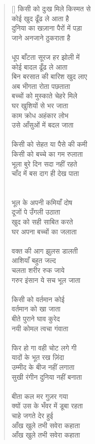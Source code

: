 \begin{verse}[\versewidth]\texthindi{
किसी को दुःख मिले किस्मत से\\
कोई खुद ढूँढ ले आता है \\
दुनिया का खज़ाना पैरों में पड़ा\\
जाने अनजाने ठुकराता है \\
\\
धूप बाँटता सूरज हर झोली में\\
कोई बादल ढूँढ ले आता\\
बिन बरसात की बारिश खुद लाए\\
अब भीगता रोता पछताता\\
बच्चों को मुस्काते चेहरे मिले\\
घर खुशियों से भर जाता\\
काम क्रोध अहंकार लोभ\\
उसे आँसुओं में बदल जाता\\
\\
किसी को सेहत या पैसे की कमी\\
किसी को बच्चे का गम रुलाता\\
भूला बुरे दिन सदा नहीं रहते\\
चाँद में बस दाग ही देख पाता\\
\\
\\
भूल के अपनी कमियाँ दोष\\
दूजों पे उँगली उठाता\\
खुद को सही साबित करते\\
घर अपना बच्चों का जलाता\\
\\
वक्त की आग झुलस डालती\\
आशियाँ बहुत जल्द\\
चलता शरीर रुक जाये\\
गरुर इंसान ये सच भूल जाता\\
\\
किसी को वर्तमान कोई\\
वर्तमान को खा जाता\\
बीते पुराने घाव कुरेद\\
नयी कोमल त्वचा गंवाता\\
\\
फिर हो गा वही चोट लगे गी\\
यादों के भूत रख ज़िंदा\\
उम्मीद के बीज नहीं लगाता\\
सुखी रंगीन दुनिया नहीं बनाता\\
\\
बीता कल मर गुज़र गया\\
क्यों उस के भँवर में डूबा रहता\\
चाहे जगते देर हुई\\
आँख खुले तभी सवेरा कहाता\\
आँख खुले तभी सवेरा कहाता
}\end{verse}

